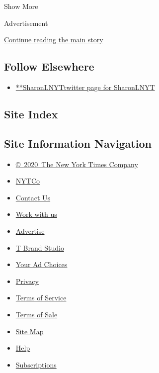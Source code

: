 Show More

Advertisement

\protect\hyperlink{after-mid2}{Continue reading the main story}

\hypertarget{follow-elsewhere}{%
\subsection{Follow Elsewhere}\label{follow-elsewhere}}

\begin{itemize}
\tightlist
\item
  \href{https://twitter.com/SharonLNYT}{**SharonLNYTtwitter page for
  SharonLNYT}
\end{itemize}

\hypertarget{site-index}{%
\subsection{Site Index}\label{site-index}}

\hypertarget{site-information-navigation}{%
\subsection{Site Information
Navigation}\label{site-information-navigation}}

\begin{itemize}
\tightlist
\item
  \href{https://help.nytimes3xbfgragh.onion/hc/en-us/articles/115014792127-Copyright-notice}{©~2020~The
  New York Times Company}
\end{itemize}

\begin{itemize}
\tightlist
\item
  \href{https://www.nytco.com/}{NYTCo}
\item
  \href{https://help.nytimes3xbfgragh.onion/hc/en-us/articles/115015385887-Contact-Us}{Contact
  Us}
\item
  \href{https://www.nytco.com/careers/}{Work with us}
\item
  \href{https://nytmediakit.com/}{Advertise}
\item
  \href{http://www.tbrandstudio.com/}{T Brand Studio}
\item
  \href{https://www.nytimes3xbfgragh.onion/privacy/cookie-policy\#how-do-i-manage-trackers}{Your
  Ad Choices}
\item
  \href{https://www.nytimes3xbfgragh.onion/privacy}{Privacy}
\item
  \href{https://help.nytimes3xbfgragh.onion/hc/en-us/articles/115014893428-Terms-of-service}{Terms
  of Service}
\item
  \href{https://help.nytimes3xbfgragh.onion/hc/en-us/articles/115014893968-Terms-of-sale}{Terms
  of Sale}
\item
  \href{https://spiderbites.nytimes3xbfgragh.onion}{Site Map}
\item
  \href{https://help.nytimes3xbfgragh.onion/hc/en-us}{Help}
\item
  \href{https://www.nytimes3xbfgragh.onion/subscription?campaignId=37WXW}{Subscriptions}
\end{itemize}
